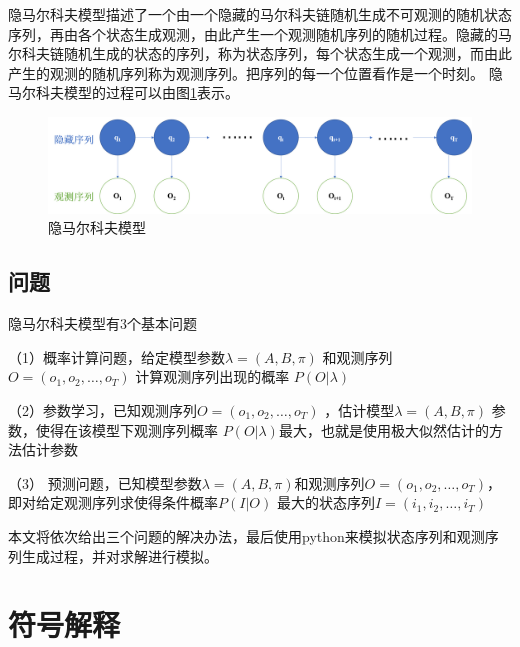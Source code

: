 \documentclass[a4paper,12pt]{ctexart}     %
\begin{document}
	隐马尔科夫模型描述了一个由一个隐藏的马尔科夫链随机生成不可观测的随机状态序列，再由各个状态生成观测，由此产生一个观测随机序列的随机过程。隐藏的马尔科夫链随机生成的状态的序列，称为状态序列，每个状态生成一个观测，而由此产生的观测的随机序列称为观测序列。把序列的每一个位置看作是一个时刻。
	隐马尔科夫模型的过程可以由图\ref{fig:shiyitu}表示。
	
	\vspace*{1\baselineskip}   %
	
	\begin{figure}[H] %
		\centering %
		\includegraphics[width=1\textwidth]{示意图.png} %
		\caption{隐马尔科夫模型 \label{fig:shiyitu}} %
	\end{figure}
	
	\subsection{问题}
	隐马尔科夫模型有3个基本问题
	
	（1）概率计算问题，给定模型参数$ \lambda = (A,B,\pi) $ 和观测序列 $ O = (o_1,o_2,\dots,o_T) $ 计算观测序列出现的概率 $ P(O|\lambda) $  
	
	（2）参数学习，已知观测序列$ O = (o_1,o_2,\dots,o_T) $ ，估计模型$ \lambda = (A,B,\pi) $ 参数，使得在该模型下观测序列概率 $ P(O|\lambda) $最大，也就是使用极大似然估计的方法估计参数
	
	（3） 预测问题，已知模型参数$ \lambda = (A,B,\pi) $和观测序列$ O = (o_1,o_2,\dots,o_T) $，即对给定观测序列求使得条件概率$ P(I|O) $ 最大的状态序列$ I = (i_1,i_2,\dots,i_T) $
	
	本文将依次给出三个问题的解决办法，最后使用python来模拟状态序列和观测序列生成过程，并对求解进行模拟。
	\section{符号解释}
	
\end{document}
